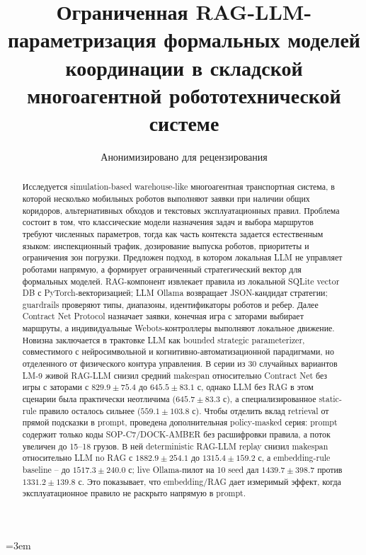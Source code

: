 \documentclass[runningheads]{llncs}
\begin{document}
\emergencystretch=3em
\sloppy

\title{Ограниченная RAG-LLM-параметризация формальных моделей координации в складской многоагентной робототехнической системе}

\author{Анонимизировано для рецензирования}

\maketitle

\begin{abstract}
Исследуется simulation-based warehouse-like многоагентная транспортная система, в которой несколько мобильных роботов выполняют заявки при наличии общих коридоров, альтернативных обходов и текстовых эксплуатационных правил. Проблема состоит в том, что классические модели назначения задач и выбора маршрутов требуют численных параметров, тогда как часть контекста задается естественным языком: инспекционный трафик, дозирование выпуска роботов, приоритеты и ограничения зон погрузки. Предложен подход, в котором локальная LLM не управляет роботами напрямую, а формирует ограниченный стратегический вектор для формальных моделей. RAG-компонент извлекает правила из локальной SQLite vector DB с PyTorch-векторизацией; LLM Ollama возвращает JSON-кандидат стратегии; guardrails проверяют типы, диапазоны, идентификаторы роботов и ребер. Далее Contract Net Protocol назначает заявки, конечная игра с заторами выбирает маршруты, а индивидуальные Webots-контроллеры выполняют локальное движение. Новизна заключается в трактовке LLM как bounded strategic parameterizer, совместимого с нейросимвольной и когнитивно-автоматизационной парадигмами, но отделенного от физического контура управления. В серии из 30 случайных вариантов LM-9 живой RAG-LLM снизил средний makespan относительно Contract Net без игры с заторами с $829.9\pm75.4$ до $645.5\pm83.1$ с, однако LLM без RAG в этом сценарии была практически неотличима ($645.7\pm83.3$ с), а специализированное static-rule правило осталось сильнее ($559.1\pm103.8$ с). Чтобы отделить вклад retrieval от прямой подсказки в prompt, проведена дополнительная policy-masked серия: prompt содержит только коды SOP-C7/DOCK-AMBER без расшифровки правила, а поток увеличен до 15--18 грузов. В ней deterministic RAG-LLM replay снизил makespan относительно LLM no RAG с $1882.9\pm254.1$ до $1315.4\pm159.2$ с, а embedding-rule baseline -- до $1517.3\pm240.0$ с; live Ollama-пилот на 10 seed дал $1439.7\pm398.7$ против $1331.2\pm139.8$ с. Это показывает, что embedding/RAG дает измеримый эффект, когда эксплуатационное правило не раскрыто напрямую в prompt.

\end{abstract}
\end{document}
